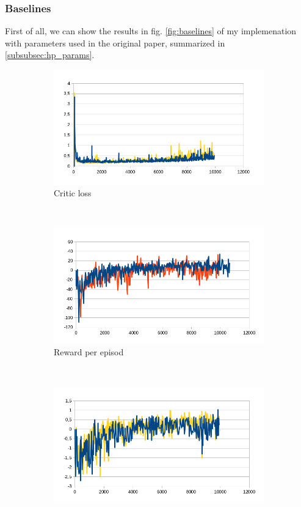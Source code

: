 \documentclass{article}
\begin{document}
\subsubsection{Baselines}

First of all, we can show the results in fig. \ref{fig:baselines} of my
implemenation with parameters used in the original paper, summarized in
\ref{subsubsec:hp_params}.

\begin{figure}[ht]
  \centering
  \begin{subfigure}[b]{.3\textwidth}
    \includegraphics[width=\textwidth]{baselines_loss}
    \caption{Critic loss}
  \end{subfigure}
  ~
  \begin{subfigure}[b]{.3\textwidth}
    \includegraphics[width=\textwidth]{baselines_reward}
    \caption{Reward per episod}
  \end{subfigure}
  ~
  \begin{subfigure}[b]{.3\textwidth}
    \includegraphics[width=\textwidth]{baselines_avg_reward}

\end{subfigure}
\end{figure}
\end{document}
